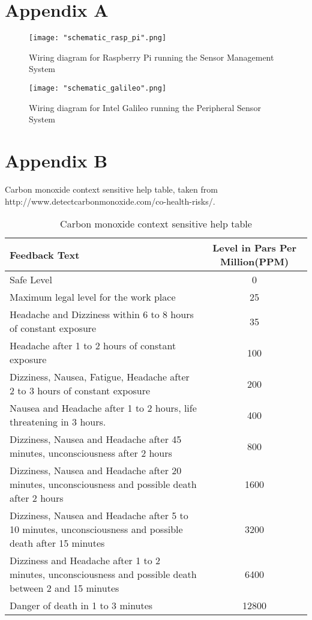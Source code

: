 \documentclass{article}
\begin{document}
\newpage
\section{Appendix A}
\label{sec:appendix_a}
\begin{figure}[h!btp]
\centering
\texttt{[image: "schematic\_rasp\_pi".png]}
\caption{Wiring diagram for Raspberry Pi running the Sensor Management System}
\label{fig:schematic_rasp_pi}
\end{figure}

\begin{figure}[h!btp]
\centering
\texttt{[image: "schematic\_galileo".png]}
\caption{Wiring diagram for Intel Galileo running the Peripheral Sensor System}
\label{fig:schematic_galileo}
\end{figure}

\newpage
\section{Appendix B}
\label{sec:appendix_b}
Carbon monoxide context sensitive help table, taken from http://www.detectcarbonmonoxide.com/co-health-risks/.


\begin{table}[H]
\def\arraystretch{2}%
\begin{center}
 \begin{tabular}{|| L{8cm} | c ||} 
 \hline
 \textbf{Feedback Text} & \textbf{Level in Pars Per Million(PPM)}  \\ [0.5ex] 
 \hline\hline
 Safe Level & 0 \\ 
 \hline
 Maximum legal level for the work place & 25 \\
 \hline
 Headache and Dizziness within 6 to 8 hours of constant exposure & 35 \\
 \hline
 Headache after 1 to 2 hours of constant exposure & 100 \\ [1ex] 
 \hline
 Dizziness, Nausea, Fatigue, Headache after 2 to 3 hours of constant exposure & 200 \\ [1ex] 
 \hline
 Nausea and Headache after 1 to 2 hours, life threatening in 3 hours. & 400 \\ [1ex] 
 \hline
 Dizziness, Nausea and Headache after 45 minutes, unconsciousness after 2 hours & 800 \\ [1ex] 
 \hline
 Dizziness, Nausea and Headache after 20 minutes, unconsciousness and possible death after 2 hours & 1600 \\ [1ex] 
 \hline
 Dizziness, Nausea and Headache after 5 to 10 minutes, unconsciousness and possible death after 15 minutes & 3200 \\ [1ex] 
 \hline
 Dizziness and Headache after 1 to 2 minutes, unconsciousness and possible death between 2 and 15 minutes & 6400 \\ [1ex] 
 \hline
 Danger of death in 1 to 3 minutes & 12800 \\ [1ex] 
 \hline
\end{tabular}
\end{center}
\caption{Carbon monoxide context sensitive help table}
\label{table:testing_op_timings}
\end{table}
\end{document}
